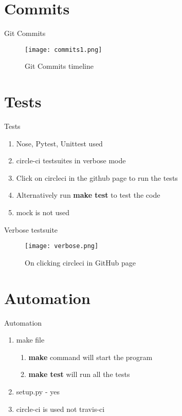 \documentclass{beamer}
\begin{document}
\section{Commits}

\begin{frame}{Git Commits}
\begin{figure}[H]
	\texttt{[image: commits1.png]}
	\caption{Git Commits timeline}
\end{figure}
\end{frame}

\section{Tests}

\begin{frame}{Tests}
\begin{enumerate}
	\item Nose, Pytest, Unittest used
	\item circle-ci testsuites in verbose mode
	\item Click on circleci in the github page to run the tests
	\item Alternatively run \textbf{make test} to test the code
	\item mock is not used
\end{enumerate}

\end{frame}

\begin{frame}{Verbose testsuite}
\begin{figure}[H]
	\texttt{[image: verbose.png]}
	\caption{On clicking circleci in GitHub page}
\end{figure}
\end{frame}


\section{Automation}

\begin{frame}{Automation}
\justifying
\begin{enumerate}
	\item make file
	\begin{enumerate}
		\item \textbf{make} command will start the program
		\item \textbf{make test} will run all the tests
	\end{enumerate}
	\item setup.py - yes
	\item circle-ci is used not travis-ci
\end{enumerate}
\end{frame}
\end{document}
